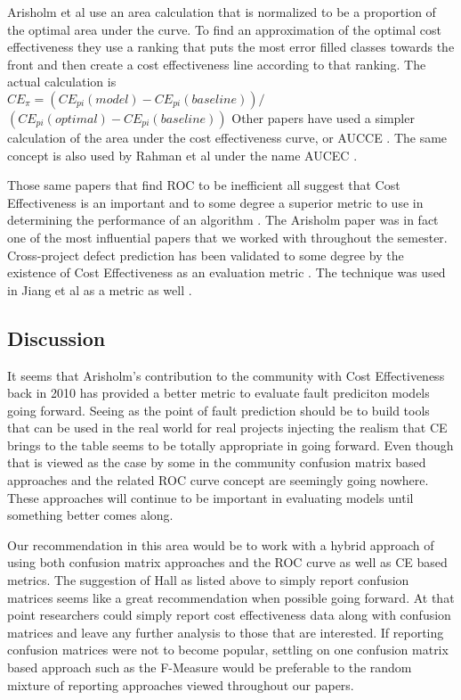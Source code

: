 \documentclass{sig-alternate-05-2015}
\begin{document}
 Arisholm et al use an area calculation that is normalized to be a proportion of the optimal area under the curve.  To find an approximation of the optimal cost effectiveness they use a ranking that puts the most error filled classes towards the front and then create a cost effectiveness line according to that ranking.  The actual calculation is\\ $CE_{\pi} = (CE_{pi}(model) - CE_{pi}(baseline))/$\\ $(CE_{pi}(optimal) - CE_{pi}(baseline))$  Other papers have used a simpler calculation of the area under the cost effectiveness curve, or AUCCE \cite{Posnett}.  The same concept is also used by Rahman et al under the name AUCEC \cite{Rahman}.

Those same papers that find ROC to be inefficient all suggest that Cost Effectiveness is an important and to some degree a superior metric to use in determining the performance of an algorithm \cite{Posnett} \cite{Arisholm} \cite{Rahman}.  The Arisholm paper was in fact one of the most influential papers that we worked with throughout the semester.  Cross-project defect prediction has been validated to some degree by the existence of Cost Effectiveness as an evaluation metric \cite{Rahman}.    The technique was used in Jiang et al as a metric as well \cite{Jiang}. 

\subsection{Discussion}
It seems that Arisholm's contribution to the community with Cost Effectiveness back in  2010 has provided a better metric to evaluate fault prediciton models going forward.  Seeing as the point of fault prediction should be to build tools that can be used in the real world for real projects injecting the realism that CE brings to the table seems to be totally appropriate in going forward.  Even though that is viewed as the case by some in the community confusion matrix based approaches and the related ROC curve concept are seemingly going nowhere.  These approaches will continue to be important in evaluating models until something better comes along.  

Our recommendation in this area would be to work with a hybrid approach of using both confusion matrix approaches and the ROC curve as well as CE based metrics.  The suggestion of Hall as listed above to simply report confusion matrices seems like a great recommendation when possible going forward.  At that point researchers could simply report cost effectiveness data along with confusion matrices and leave any further analysis to those that are interested.  If reporting confusion matrices were not to become popular, settling on one confusion matrix based approach such as the F-Measure would be preferable to the random mixture of reporting approaches viewed throughout our papers.
\end{document}
